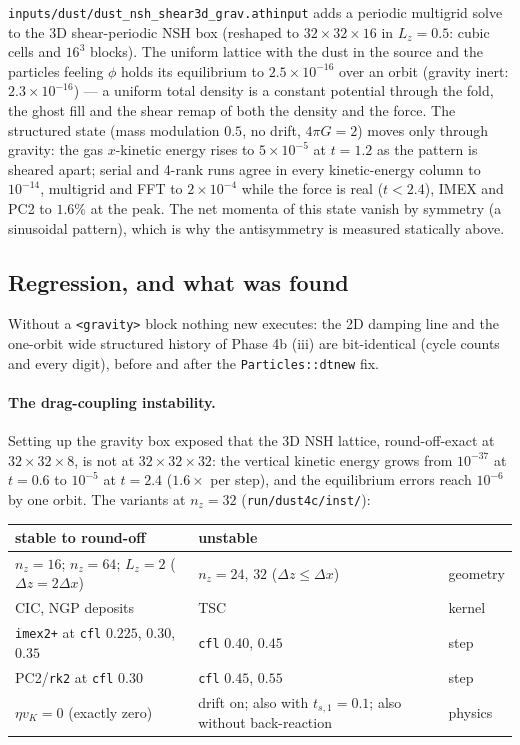 \documentclass[11pt]{article}
\newcommand{\code}[1]{\texttt{#1}}
\newcommand{\file}[1]{\texttt{#1}}
\begin{document}
\file{inputs/dust/dust\_nsh\_shear3d\_grav.athinput} adds a periodic multigrid solve to
the 3D shear-periodic NSH box (reshaped to $32\times32\times16$ in $L_z = 0.5$: cubic
cells and $16^3$ blocks). The uniform lattice with the dust in the source and the
particles feeling $\phi$ holds its equilibrium to $2.5\times10^{-16}$ over an orbit
(gravity inert: $2.3\times10^{-16}$) --- a uniform total density is a constant potential
through the fold, the ghost fill and the shear remap of both the density and the force.
The structured state (mass modulation $0.5$, no drift, $4\pi G = 2$) moves only through
gravity: the gas $x$-kinetic energy rises to $5\times10^{-5}$ at $t = 1.2$ as the pattern
is sheared apart; serial and 4-rank runs agree in every kinetic-energy column to
$10^{-14}$, multigrid and FFT to $2\times10^{-4}$ while the force is real ($t < 2.4$),
IMEX and PC2 to $1.6\%$ at the peak. The net momenta of this state vanish by symmetry
(a sinusoidal pattern), which is why the antisymmetry is measured statically above.

\subsection{Regression, and what was found}

Without a \code{<gravity>} block nothing new executes: the 2D damping line and the
one-orbit wide structured history of Phase 4b (iii) are bit-identical (cycle counts and
every digit), before and after the \code{Particles::dtnew} fix.

\paragraph{The drag-coupling instability.} Setting up the gravity box exposed that the
3D NSH lattice, round-off-exact at $32\times32\times8$, is not at $32\times32\times32$:
the vertical kinetic energy grows from $10^{-37}$ at $t = 0.6$ to $10^{-5}$ at $t = 2.4$
($1.6\times$ per step), and the equilibrium errors reach $10^{-6}$ by one orbit. The
variants at $n_z = 32$ (\file{run/dust4c/inst/}):

\begin{center}
\small
\begin{tabular}{@{}lll@{}}
\toprule
stable to round-off & unstable & \\
\midrule
$n_z = 16$; $n_z = 64$; $L_z = 2$ ($\Delta z = 2\Delta x$) & $n_z = 24$, $32$ ($\Delta z \le \Delta x$) & geometry \\
CIC, NGP deposits & TSC & kernel \\
\code{imex2+} at \code{cfl} $0.225$, $0.30$, $0.35$ & \code{cfl} $0.40$, $0.45$ & step \\
PC2/\code{rk2} at \code{cfl} $0.30$ & \code{cfl} $0.45$, $0.55$ & step \\
$\eta v_K = 0$ (exactly zero) & drift on; also with $t_{s,1} = 0.1$; also without back-reaction & physics \\
\bottomrule
\end{tabular}
\end{center}
\end{document}
